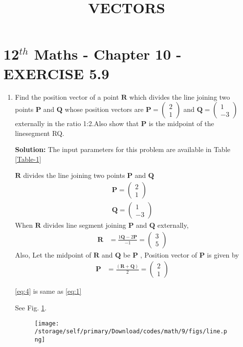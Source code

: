 \documentclass[12pt]{article}
\let\vec\mathbf
\newcommand{\solution}{\noindent \textbf{Solution: }}
\newcommand{\myvec}[1]{\ensuremath{\begin{pmatrix}#1\end{pmatrix}}}
\let\vec\mathbf{}
\begin{document}
\begin{center}
\title{\textbf{VECTORS}}
\date{\vspace{-5ex}} %
\maketitle
\end{center}
\setcounter{page}{1}
\section*{12$^{th}$ Maths - Chapter 10 - EXERCISE 5.9}

\begin{enumerate}

	\item Find the position vector of a point $\vec{R}$ which divides the line joining two points $\vec{ P}$ and $\vec{Q}$ whose position vectors are $\vec{P} = \myvec{2\\ 1 }$ and $\vec{Q} = \myvec{ 1\\-3 }$  externally in the ratio 1:2.Also show that $\vec{P}$ is the midpoint of the linesegment RQ.

\solution The input parameters for this problem are available in Table \ref{Table-1}
\begin{table}[ht!]

\caption{}
\label{Table-1}	
\end{table}
	
$\vec{R}$ divides the line joining two points $\vec{P}$ and $\vec{Q}$ 
\begin{align}
\vec{P} = \myvec{ 2\\1}
\label{eq:eq:1}\\ 
\vec{Q} = \myvec{ 1\\-3}
\end{align}
When $\vec{R}$ divides line segment joining $\vec{P}$ and $\vec{Q}$ externally,
\begin{align}
	\vec{R} &= \frac{1\vec{Q}-2\vec{P}}{-1}
	         = \myvec{3\\5}
\end{align}	
Also,
		Let the midpoint of $\vec{R}$ and $\vec{Q}$ be $\vec{P}$ , Position vector of $\vec{P}$ is given by
\begin{align}
	\vec{P} &= \frac{(\vec{R} + \vec{Q})}{2} 
	=\myvec{2\\1}
	\label{eq:eq:4}
\end{align}
		
			\eqref{eq:4} is same as \eqref{eq:1}
		
See Fig.
\ref{fig:/storage/self/primary/Download/codes/math/9/figs/figure1}.
\begin{figure}[!h]
	\begin{center}
	\texttt{[image: /storage/self/primary/Download/codes/math/9/figs/line.png]}
	\end{center}
        \caption{}
        \label{fig:/storage/self/primary/Download/codes/math/9/figs/figure1}
 \end{figure}
\end{enumerate}
\end{document}
